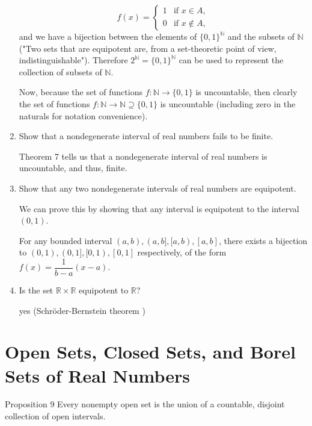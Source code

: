 \begin{enumerate}
	\[
		f(x) =
	\begin{cases}
		1 & \text{if } x \in A,\\
		0 & \text{if } x \notin A,
	\end{cases}	
	\]
	and we have a bijection between the elements of $\{0,1\}^{\mathbb{N}}$ and the subsets of $\mathbb{N}$ ("Two sets that are equipotent are, from a set-theoretic point of view, indistinguishable").
	Therefore $2^{\mathbb{N}}= \{0,1\}^{\mathbb{N}}$ can be used to represent the collection of subsets of $\mathbb{N}$.\par
	Now, because the set of functions $f:\mathbb{N} \to \{0,1\}$ is uncountable, then clearly the set of functions $f:\mathbb{N} \to \mathbb{N} \supseteq \{0,1\}$ is uncountable (including zero in the naturals for notation convenience).
	\item Show that a nondegenerate interval of real numbers fails to be finite.\par
	Theorem 7 tells us that a nondegenerate interval of real numbers is uncountable, and thus, finite.	
	\item Show that any two nondegenerate intervals of real numbers are equipotent.\par
	We can prove this by showing that any interval is equipotent to the interval $(0,1)$.\par
	For any bounded interval $(a,b),(a,b],[a,b),[a,b]$, there exists a bijection to $(0,1),(0,1],[0,1),[0,1]$ respectively,
	of the form $f(x) = \dfrac{1}{b-a}(x-a)$.\par
	\item Is the set $\mathbb{R} \times \mathbb{R}$ equipotent to $\mathbb{R}$?\par
	yes (Schr\"oder-Bernstein theorem	)
\end{enumerate}

\section{Open Sets, Closed Sets, and Borel Sets of Real Numbers}

\begin{namedthm*}{Proposition 9}
	Every nonempty open set is the union of a countable, disjoint collection of open intervals.	
\end{namedthm*}

